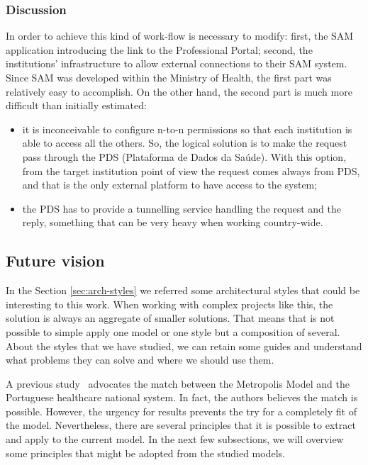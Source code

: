 
\subsubsection{Discussion}

In order to achieve this kind of work-flow is necessary to modify: first, the SAM application introducing the link to the Professional Portal; second, the institutions' infrastructure to allow external connections to their SAM system. Since SAM was developed within the Ministry of Health, the first part was relatively easy to accomplish. On the other hand, the second part is much more difficult than initially estimated:
\begin{itemize}
\item it is inconceivable to configure n-to-n permissions so that each institution is able to access all the others. So, the logical solution is to make the request pass through the PDS (Plataforma de Dados da Saúde). With this option, from the target institution point of view the request comes always from PDS, and that is the only external platform to have access to the system;
\item the PDS has to provide a tunnelling service handling the request and the reply, something that can be very heavy when working country-wide.
\end{itemize}



\subsection{Future vision}

In the Section \ref{sec:arch-styles} we referred some architectural styles that could be interesting to this work. When working with complex projects like this, the solution is always an aggregate of smaller solutions. That means that is not possible to simple apply one model or one style but a composition of several. About the styles that we have studied, we can retain some guides and understand what problems they can solve and where we should use them.

A previous study~\citep{Carvalho2011a} advocates the match between the Metropolis Model and the Portuguese healthcare national system. In fact, the authors believes the match is possible. However, the urgency for results prevents the try for a completely fit of the model. Nevertheless, there are several principles that it is possible to extract and apply to the current model. In the next few subsections, we will overview some principles that might be adopted from the studied models.



